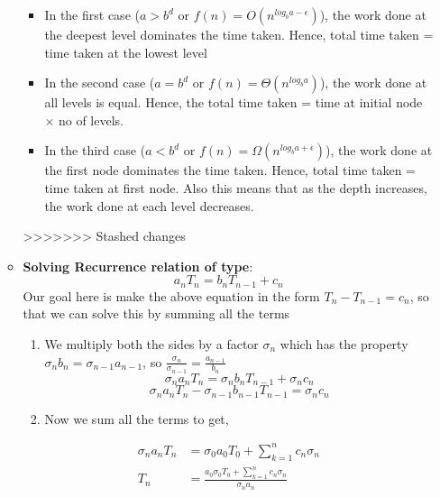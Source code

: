 \documentclass{article}
\begin{document}
\begin{enumerate}
\begin{itemize}
	\begin{itemize}
	\item In the first case ($a>b^d\text{ or }f(n)= O(n^{log_ba-\epsilon})$), the work done at the deepest level dominates the time taken. Hence, total time taken = time taken at the lowest level
	\item In the second case ($a=b^d\text{ or }f(n)= \Theta(n^{log_ba})$), the work done at all levels is equal. Hence, the total time taken = time at initial node $\times$ no of levels.
	\item In the third case ($a<b^d\text{ or }f(n)= \Omega(n^{log_ba+\epsilon})$), the work done at the first node dominates the time taken. Hence, total time taken = time taken at first node. Also this means that as the depth increases, the work done at each level decreases. 
	\end{itemize}
>>>>>>> Stashed changes


		\item \textbf{Solving Recurrence relation  of type}:
			\[a_n T_n = b_n T_{n-1} + c_n\]
		Our goal here is make the above equation in the form $T_n - T_{n-1} = c_n$, so that we can solve this by summing all the terms
		\begin{enumerate}
			\item We multiply both the sides by a factor $\sigma_n$ which has the property $\sigma_n b_n = \sigma_{n-1} a_{n-1}$, so $\frac{\sigma_n}{\sigma_{n-1}}= \frac{a_{n-1}}{b_n}$
			\[\sigma_n a_n T_n = \sigma_n b_n T_{n-1} + \sigma_n c_n \]
			\[\sigma_n a_n T_n - \sigma_{n-1} b_{n-1} T_{n-1} = \sigma_n c_n\]
			\item Now we sum all the terms to get,
		\end{enumerate}
		\begin{align*}
			\sigma_n a_n T_n &= \sigma_0 a_0 T_0 + \sum_{k=1}^n c_n \sigma_n\\
					T_n &= \frac{ a_0 \sigma_0 T_0 + \sum_{k=1}^n c_n \sigma_n}{\sigma_n a_n} 
		\end{align*}


\end{itemize}
\end{enumerate}
\end{document}
